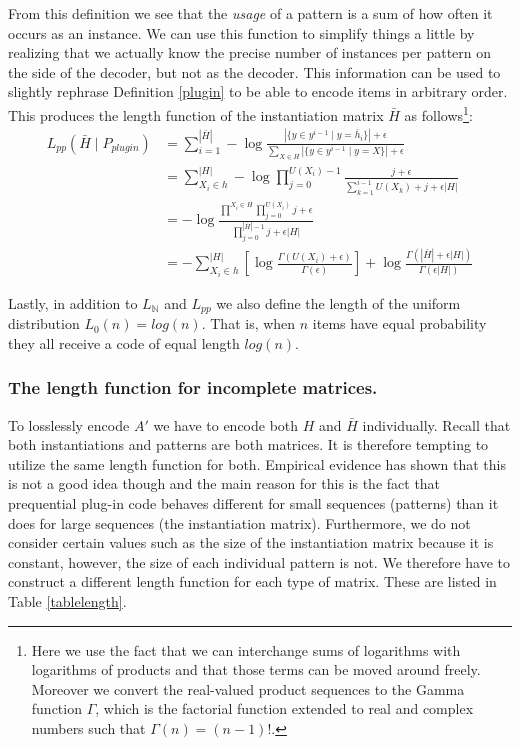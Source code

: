 \documentclass{llncs}
\begin{document}
From this definition we see that the \emph{usage} of a pattern is a sum of how often it occurs as an instance. We can use this function to simplify things a little by realizing that we actually know the precise number of instances per pattern on the side of the decoder, but not as the decoder. This information can be used to slightly rephrase Definition \ref{plugin} to be able to encode items in arbitrary order. This produces the length function of the instantiation matrix $\bar{H}$ as follows\footnote{Here we use the fact that we can interchange sums of logarithms with logarithms of products and that those terms can be moved around freely. Moreover we convert the real-valued product sequences to the Gamma function $\Gamma$, which is the factorial function extended to real and complex numbers such that $\Gamma(n) = (n-1)!$.}:
\begin{align*}
	L_{pp}(\bar{H}\mid P_{plugin}) &= \sum^{|\bar{H}|}_{i=1} -\log \frac{|\{y \in y^{i-1} \mid y = \bar{h}_i\}| + \epsilon }{\sum_{X \in H}|\{y \in y^{i-1} \mid y = X\}| + \epsilon}\\
	&= \sum^{|H|}_{X_i \in h} -\log \prod^{U(X_i)-1}_{j=0} \frac{j+\epsilon}{\sum^{i-1}_{k=1} U(X_k)+j+\epsilon|H|} \\
	&= -\log \frac{\prod^{X_i\in H} \prod^{U(X_i)}_{j=0} j + \epsilon}{\prod^{|\bar{H}|-1}_{j=0} j + \epsilon|H|} \\
	&= -\sum^{|H|}_{X_i \in h} \left[ \log \frac{\Gamma(U(X_i)+\epsilon)}{\Gamma(\epsilon)}\right] + \log \frac{\Gamma(|\bar{H}| + \epsilon|H|)}{\Gamma(\epsilon|H|)}
\end{align*}

Lastly, in addition to $L_{\mathbb{N}}$ and $L_{pp}$ we also define the length of the uniform distribution $L_0(n)=log(n)$. That is, when $n$ items have equal probability they all receive a code of equal length $log(n)$.

\subsubsection{The length function for incomplete matrices.}

To losslessly encode $A'$ we have to encode both $H$ and $\bar{H}$ individually. Recall that both instantiations and patterns are both matrices. It is therefore tempting to utilize the same length function for both. Empirical evidence has shown that this is not a good idea though and the main reason for this is the fact that prequential plug-in code behaves different for small sequences (patterns) than it does for large sequences (the instantiation matrix). Furthermore, we do not consider certain values such as the size of the instantiation matrix because it is constant, however, the size of each individual pattern is not. We therefore have to construct a different length function for each type of matrix. These are listed in Table \ref{tablelength}.
\end{document}
